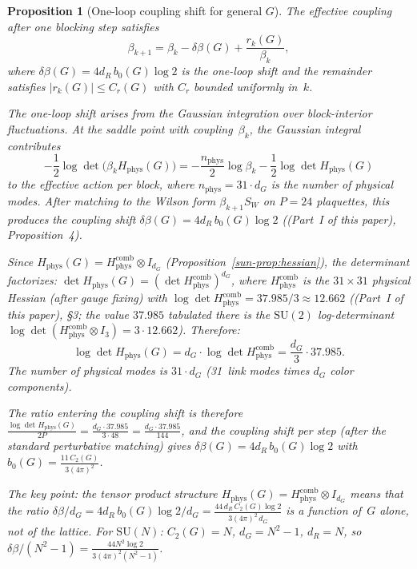 \documentclass[11pt]{article}
\newtheorem{proposition}[theorem]{Proposition}
\theoremstyle{definition}
\newcommand{\SU}{\mathrm{SU}}
\begin{document}
\begin{proposition}[One-loop coupling shift for general $G$]
\label{sun-prop:oneloop}
The effective coupling after one blocking step satisfies
\begin{equation}\label{sun-eq:coupling-flow}
\beta_{k+1}=\beta_k-\delta\beta(G)+\frac{r_k(G)}{\beta_k},
\end{equation}
where $\delta\beta(G)=4d_R\,b_0(G)\log 2$ is the one-loop
shift and the remainder satisfies $|r_k(G)|\le C_r(G)$
with $C_r$ bounded uniformly in~$k$.

The one-loop shift arises from the Gaussian
integration over block-interior fluctuations.
At the saddle point with coupling~$\beta_k$,
the Gaussian integral contributes
\begin{equation}\label{sun-eq:logdet}
-\frac{1}{2}\log\det\bigl(\beta_k H_{\mathrm{phys}}(G)
\bigr)
=-\frac{n_{\mathrm{phys}}}{2}\log\beta_k
-\frac{1}{2}\log\det H_{\mathrm{phys}}(G)
\end{equation}
to the effective action per block, where
$n_{\mathrm{phys}}=31\cdot d_G$ is the number
of physical modes.  After matching to the Wilson form
$\beta_{k+1}S_W$ on $P=24$ plaquettes, this produces
the coupling shift $\delta\beta(G)=4d_R\,b_0(G)\log 2$
((Part~I of this paper), Proposition~4).

Since $H_{\mathrm{phys}}(G)
=H_{\mathrm{phys}}^{\mathrm{comb}}\otimes I_{d_G}$
(Proposition~\ref{sun-prop:hessian}), the determinant
factorizes:
$\det H_{\mathrm{phys}}(G)
=(\det H_{\mathrm{phys}}^{\mathrm{comb}})^{d_G}$,
where $H_{\mathrm{phys}}^{\mathrm{comb}}$ is the
$31\times 31$ physical Hessian (after gauge fixing)
with $\log\det H_{\mathrm{phys}}^{\mathrm{comb}}
=37.985/3\approx 12.662$
((Part~I of this paper), \S3; the value $37.985$ tabulated
there is the $\SU(2)$ log-determinant
$\log\det(H_{\mathrm{phys}}^{\mathrm{comb}}
\otimes I_3)=3\cdot 12.662$).
Therefore:
\begin{equation}
\log\det H_{\mathrm{phys}}(G)
=d_G\cdot\log\det H_{\mathrm{phys}}^{\mathrm{comb}}
=\frac{d_G}{3}\cdot 37.985.
\end{equation}
The number of physical modes is $31\cdot d_G$
(31~link modes times $d_G$ color components).

The ratio entering the coupling shift is therefore
$\frac{\log\det H_{\mathrm{phys}}(G)}{2P}
=\frac{d_G\cdot 37.985}{3\cdot 48}
=\frac{d_G\cdot 37.985}{144}$,
and the coupling shift per step (after the standard
perturbative matching) gives
$\delta\beta(G)=4d_R\,b_0(G)\log 2$ with
$b_0(G)=\frac{11\,C_2(G)}{3(4\pi)^2}$.

The key point: the tensor product structure
$H_{\mathrm{phys}}(G)
=H_{\mathrm{phys}}^{\mathrm{comb}}\otimes I_{d_G}$
means that the \emph{ratio}
$\delta\beta/d_G=4d_R\,b_0(G)\log 2/d_G
=\frac{44\,d_R\,C_2(G)\log 2}{3(4\pi)^2\,d_G}$
is a function of~$G$ alone, not of the lattice.
For $\SU(N)$: $C_2(G)=N$, $d_G=N^2-1$, $d_R=N$, so
$\delta\beta/(N^2-1)=\frac{44N^2\log 2}{3(4\pi)^2(N^2-1)}$.
\end{proposition}
\end{document}
